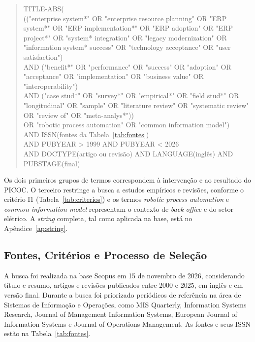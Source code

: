 \begin{quote}
\raggedright\small\ttfamily
TITLE-ABS(\\
\quad (("enterprise system*" OR "enterprise resource planning" OR "ERP system*" OR "ERP implementation*" OR "ERP adoption" OR "ERP project*" OR "system* integration" OR "legacy modernization" OR "information system* success" OR "technology acceptance" OR "user satisfaction")\\
\quad AND ("benefit*" OR "performance" OR "success" OR "adoption" OR "acceptance" OR "implementation" OR "business value" OR "interoperability")\\
\quad AND ("case stud*" OR "survey*" OR "empirical*" OR "field stud*" OR "longitudinal" OR "sample" OR "literature review" OR "systematic review" OR "review of" OR "meta-analys*"))\\
\quad OR "robotic process automation" OR "common information model")\\
AND ISSN(fontes da Tabela~\ref{tab:fontes})\\
AND PUBYEAR > 1999 AND PUBYEAR < 2026\\
AND DOCTYPE(artigo ou revisão) AND LANGUAGE(inglês) AND PUBSTAGE(final)
\end{quote}

Os dois primeiros grupos de termos correspondem à intervenção e ao resultado do PICOC. O terceiro restringe a busca a estudos empíricos e revisões, conforme o critério I1 (Tabela~\ref{tab:criterios}) e os termos \textit{robotic process automation} e \textit{common information model} representam o contexto de \textit{back-office} e do setor elétrico. A \textit{string} completa, tal como aplicada na base, está no Apêndice~\ref{ap:string}.

\subsection{Fontes, Critérios e Processo de Seleção}

A busca foi realizada na base Scopus em 15 de novembro de 2026, considerando título e resumo, artigos e revisões publicados entre 2000 e 2025, em inglês e em versão final. Durante a busca foi priorizado periódicos de referência na área de Sistemas de Informação e Operações, como MIS Quarterly, Information Systems Research, Journal of Management Information Systems, European Journal of Information Systems e Journal of Operations Management. As fontes e seus ISSN estão na Tabela~\ref{tab:fontes}.

